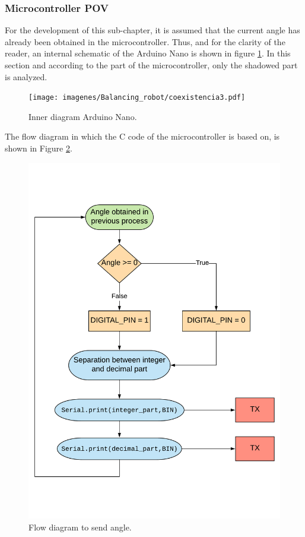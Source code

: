 \subsubsection{Microcontroller POV}  \label{sec:vista_controlador}

For the development of this sub-chapter, it is assumed that the current angle has already been obtained in the microcontroller. Thus, and for the clarity of the reader, an internal schematic of the Arduino Nano is shown in figure \ref{fig:coexistencia3}. In this section and according to the part of the microcontroller, only the shadowed part is analyzed. 

\begin{figure}[H]
	\center
	\texttt{[image: imagenes/Balancing\_robot/coexistencia3.pdf]}
	\caption{Inner diagram Arduino Nano.}
	\label{fig:coexistencia3}
\end{figure}

The flow diagram in which the C code of the microcontroller is based on, is shown in Figure \ref{fig:extraccion_angulo}.

\begin{figure}[H]
	\center
	\includegraphics[trim = 0mm 0mm 0mm 0mm, clip,scale=0.5]{imagenes/Balancing_robot/extraccion_angulo.pdf}
	\caption{Flow diagram to send angle.}
	\label{fig:extraccion_angulo}
\end{figure}

